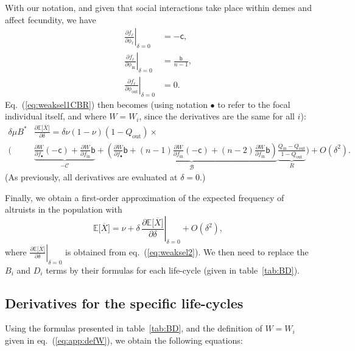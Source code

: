 \documentclass[11pt, letterpaper]{article}
\renewcommand{\eqref}[1]{\textup{{\normalfont eq.~(\ref{#1}}\normalfont)}}
\newcommand{\Eqref}[1]{Eq.~(\ref{#1})}
\newcommand{\deriv}[2]{\partial_{#2}\!{#1}\,}
\newcommand{\derivv}[3]{\left.\frac{\partial #1}{\partial #2}\right |_{#3=0}} %
\newcommand{\derivn}[2]{\frac{\partial #1}{\partial #2}}
\newcommand{\Esp}[1]{\mathbb{E}\big[ #1\big]}%
\newcommand{\bigO}[1]{O\left( #1 \right)}
\newcommand{\bb}{\mathsf{b}}
\newcommand{\cc}{\mathsf{c}}
\newcommand{\mutbias}{\nu}
\newcommand{\inn}{\textrm{in}}
\newcommand{\out}{\textrm{out}}
\newcommand{\focal}{\bullet}
\newcommand{\selstr}{\delta}
\begin{document}
With our notation, and given that social interactions take place within demes and affect fecundity, we have
\begin{subequations}\label{eq:derivf}
\begin{align}
\derivv{f_{\ell}}{\phi_{\ell}}{\selstr} & = -\cc,\\
\derivv{f_{\ell}}{\phi_{\inn}}{\selstr} & = \frac{\bb}{n-1},\\
\derivv{f_{\ell}}{\phi_{\out}}{\selstr} & = 0.
\end{align}
\end{subequations}
%
\Eqref{eq:weaksel1CBR} then becomes (using notation $\focal$ to refer to the focal individual itself, and where $W=W_i$, since the derivatives are the same for all $i$):
%
\begin{equation}\label{eq:weaksel2}
\begin{split}
\selstr \mu B^* & \derivn{\Esp{\overline{X}}}{\selstr} = \selstr  \mutbias (1-\mutbias) (1 - Q_{\out}) \times \\
 \Bigg( &\underbrace{ \derivn{W}{f_{\focal}} (-\cc) + \derivn{W}{f_{\inn}} \bb}_{-\mathcal{C}} + \underbrace{ \left( \derivn{W}{f_{\focal}} \bb + (n-1) \derivn{W}{f_{\inn}} (-\cc) + (n-2) \derivn{W}{f_{\inn}} \bb \right) }_{\mathcal{B}} \underbrace{\frac{Q_{\inn} - Q_{\out}}{1 - Q_{\out}}}_{R} \Bigg)  + \bigO{\selstr^2}.
\end{split}
\end{equation}
%
(As previously, all derivatives are evaluated at $\selstr = 0$.)

Finally, we obtain a first-order approximation of the expected frequency of altruists in the population with 
\begin{equation}\label{eq:app:EXgeneric}
\Esp{\overline{X}} = \mutbias + \selstr \,  \derivv{\Esp{\overline{X}}}{\selstr}{\selstr} + \bigO{\selstr^2},
\end{equation}
where $\derivv{\Esp{\overline{X}}}{\selstr}{\selstr}$ is obtained from \eqref{eq:weaksel2}. We then need to replace the $B_{i}$ and $D_{i}$ terms by their formulas for each life-cycle (given in table~\ref{tab:BD}).

\subsection{Derivatives for the specific life-cycles\label{sec:app:dW}}

Using the formulas presented in table~\ref{tab:BD}, and the definition of $W=W_i$ given in \eqref{eq:app:defW}, we obtain the following equations:
\end{document}
